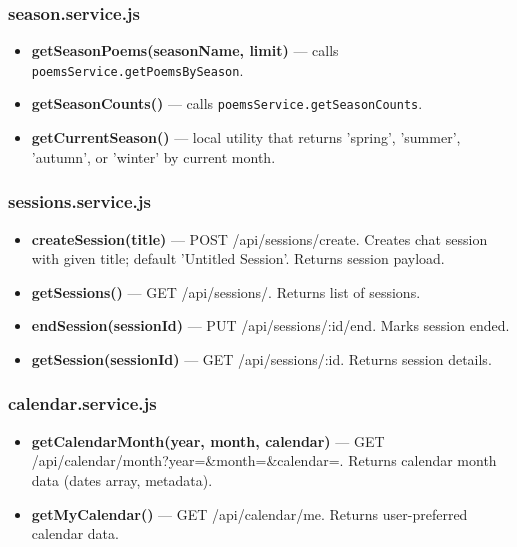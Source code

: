 \documentclass[11pt]{article}
\begin{document}
\subsubsection{season.service.js}
\begin{itemize}
	\item \textbf{getSeasonPoems(seasonName, limit)} — calls \texttt{poemsService.getPoemsBySeason}.
	\item \textbf{getSeasonCounts()} — calls \texttt{poemsService.getSeasonCounts}.
	\item \textbf{getCurrentSeason()} — local utility that returns 'spring', 'summer', 'autumn', or 'winter' by current month.
\end{itemize}

\subsubsection{sessions.service.js}
\begin{itemize}
	\item \textbf{createSession(title)} — POST /api/sessions/create. Creates chat session with given title; default 'Untitled Session'. Returns session payload.
	\item \textbf{getSessions()} — GET /api/sessions/. Returns list of sessions.
	\item \textbf{endSession(sessionId)} — PUT /api/sessions/:id/end. Marks session ended.
	\item \textbf{getSession(sessionId)} — GET /api/sessions/:id. Returns session details.
\end{itemize}

\subsubsection{calendar.service.js}
\begin{itemize}
	\item \textbf{getCalendarMonth(year, month, calendar)} — GET /api/calendar/month?year=&month=&calendar=. Returns calendar month data (dates array, metadata).
	\item \textbf{getMyCalendar()} — GET /api/calendar/me. Returns user-preferred calendar data.
\end{itemize}
\end{document}
